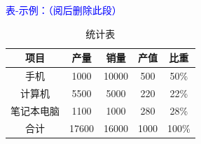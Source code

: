\textcolor{blue}{表-示例：（阅后删除此段）}

\begin{table}[htbp]
  \vspace{11pt}  %
  \linespread{1.5}
  \small
  \centering
  \caption{统计表}\label{统计表}
  \begin{tabular}{ccccc}
    \hline
    项目    & 产量    & 销量    & 产值   & 比重    \\ \hline
    手机    & 1000  & 10000 & 500  & 50\%  \\
    计算机   & 5500  & 5000  & 220  & 22\%  \\
    笔记本电脑 & 1100  & 1000  & 280  & 28\%  \\ \hline
    合计    & 17600 & 16000 & 1000 & 100\% \\ \hline
    \end{tabular}
  \vspace{11pt}
\end{table}
